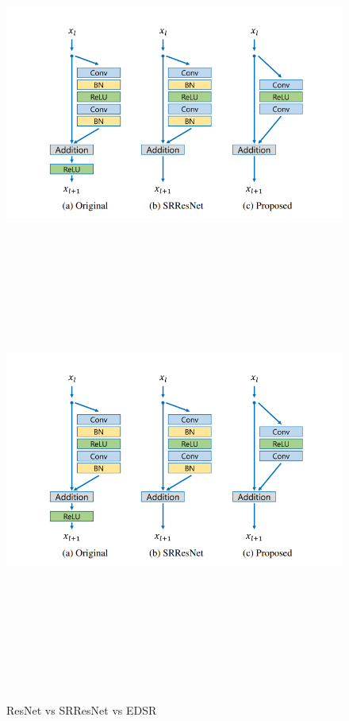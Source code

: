 \begin{figure}[!htbp]
  \begin{center}
    \leavevmode
    \ifpdf
      \includegraphics[height=3in]{Chapter1/Chapter1Figs/edsr.png}
    \else
      \includegraphics[bb = 92 86 545 742, height=6in]{Chapter1/Chapter1Figs/edsr.png}
    \fi
    \caption{ResNet vs SRResNet vs EDSR \cite{lim2017enhanced}}
    \label{EDSR Architecture}
  \end{center}
\end{figure}

